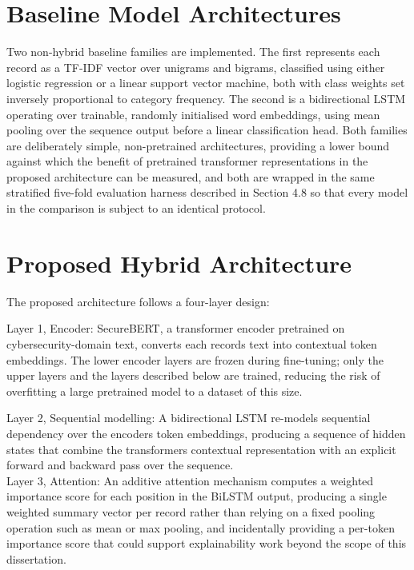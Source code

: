 \documentclass[12pt,a4paper]{report}
\begin{document}
\section{Baseline Model
Architectures}\label{baseline-model-architectures}

Two non-hybrid baseline families are implemented. The first represents
each record as a TF-IDF vector over unigrams and bigrams, classified
using either logistic regression or a linear support vector machine,
both with class weights set inversely proportional to category
frequency. The second is a bidirectional LSTM operating over trainable,
randomly initialised word embeddings, using mean pooling over the
sequence output before a linear classification head. Both families are
deliberately simple, non-pretrained architectures, providing a lower
bound against which the benefit of pretrained transformer
representations in the proposed architecture can be measured, and both
are wrapped in the same stratified five-fold evaluation harness
described in Section 4.8 so that every model in the comparison is
subject to an identical protocol.
\section{Proposed Hybrid
Architecture}\label{proposed-hybrid-architecture}

The proposed architecture follows a four-layer design:

Layer 1, Encoder: SecureBERT, a transformer encoder pretrained on
cybersecurity-domain text, converts each record\textquotesingle s text
into contextual token embeddings. The lower encoder layers are frozen
during fine-tuning; only the upper layers and the layers described below
are trained, reducing the risk of overfitting a large pretrained model
to a dataset of this size.

Layer 2, Sequential modelling: A bidirectional LSTM re-models sequential
dependency over the encoder\textquotesingle s token embeddings,
producing a sequence of hidden states that combine the
transformer\textquotesingle s contextual representation with an explicit
forward and backward pass over the sequence.\\
Layer 3, Attention: An additive attention mechanism computes a weighted
importance score for each position in the BiLSTM output, producing a
single weighted summary vector per record rather than relying on a fixed
pooling operation such as mean or max pooling, and incidentally
providing a per-token importance score that could support explainability
work beyond the scope of this dissertation.
\end{document}
